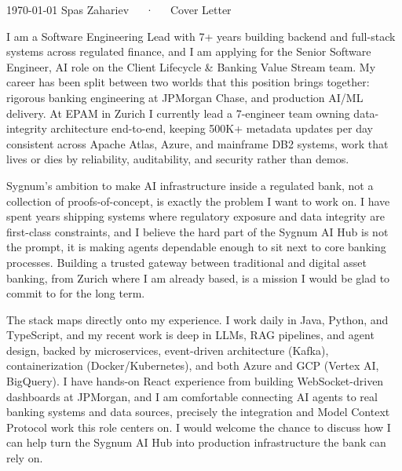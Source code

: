 \documentclass[11pt, a4paper]{awesome-cv}
\begin{document}
\makecvheader[R]

\makecvfooter
  {\today}
  {Spas Zahariev~~~·~~~Cover Letter}
  {}

\makelettertitle

\begin{cvletter}

I am a Software Engineering Lead with 7+ years building backend and full-stack systems across regulated finance, and I am applying for the Senior Software Engineer, AI role on the Client Lifecycle \& Banking Value Stream team. My career has been split between two worlds that this position brings together: rigorous banking engineering at JPMorgan Chase, and production AI/ML delivery. At EPAM in Zurich I currently lead a 7-engineer team owning data-integrity architecture end-to-end, keeping 500K+ metadata updates per day consistent across Apache Atlas, Azure, and mainframe DB2 systems, work that lives or dies by reliability, auditability, and security rather than demos.

Sygnum's ambition to make AI infrastructure inside a regulated bank, not a collection of proofs-of-concept, is exactly the problem I want to work on. I have spent years shipping systems where regulatory exposure and data integrity are first-class constraints, and I believe the hard part of the Sygnum AI Hub is not the prompt, it is making agents dependable enough to sit next to core banking processes. Building a trusted gateway between traditional and digital asset banking, from Zurich where I am already based, is a mission I would be glad to commit to for the long term.

The stack maps directly onto my experience. I work daily in Java, Python, and TypeScript, and my recent work is deep in LLMs, RAG pipelines, and agent design, backed by microservices, event-driven architecture (Kafka), containerization (Docker/Kubernetes), and both Azure and GCP (Vertex AI, BigQuery). I have hands-on React experience from building WebSocket-driven dashboards at JPMorgan, and I am comfortable connecting AI agents to real banking systems and data sources, precisely the integration and Model Context Protocol work this role centers on. I would welcome the chance to discuss how I can help turn the Sygnum AI Hub into production infrastructure the bank can rely on.

\end{cvletter}


\makeletterclosing
\end{document}
